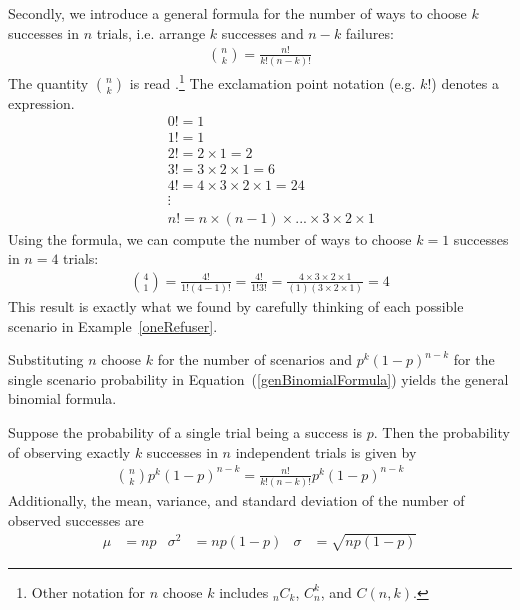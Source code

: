Secondly, we introduce a general formula for the number of ways to choose $k$ successes in $n$ trials, i.e. arrange $k$ successes and $n-k$ failures:
\begin{eqnarray*}
{n\choose k} = \frac{n!}{k!(n-k)!}
\end{eqnarray*}
The quantity ${n\choose k}$ is read .\footnote{Other notation for $n$ choose $k$ includes $_nC_k$, $C_n^k$, and $C(n,k)$.} The exclamation point notation (e.g. $k!$) denotes a \label{factorialDefinitionInTheBinomialSection} expression.
\begin{eqnarray*}
&& 0! = 1 \label{zeroFactorial} \\
&& 1! = 1 \\
&& 2! = 2\times1 = 2 \\
&& 3! = 3\times2\times1 = 6 \\
&& 4! = 4\times3\times2\times1 = 24 \\
&& \vdots \\
&& n! = n\times(n-1)\times...\times3\times2\times1
\end{eqnarray*}
Using the formula, we can compute the number of ways to choose $k=1$ successes in $n=4$ trials:
\begin{eqnarray*}
{4 \choose 1} = \frac{4!}{1!(4-1)!} =  \frac{4!}{1!3!} 
	= \frac{4\times3\times2\times1}{(1)(3\times2\times1)} = 4
\end{eqnarray*}
This result is exactly what we found by carefully thinking of each possible scenario in Example~\ref{oneRefuser}.

Substituting $n$ choose $k$ for the number of scenarios and $p^k(1-p)^{n-k}$ for the single scenario probability in Equation~(\ref{genBinomialFormula}) yields the general binomial formula.

\begin{termBox}{ Suppose the probability of a single trial being a success is $p$. Then the probability of observing exactly $k$ successes in $n$ independent trials is given by\vspace{-1mm}
\begin{eqnarray}
{n\choose k}p^k(1-p)^{n-k} = \frac{n!}{k!(n-k)!}p^k(1-p)^{n-k}
\label{binomialFormula}
\end{eqnarray}
Additionally, the mean, variance, and standard deviation of the number of observed successes are\vspace{-2mm}
\begin{align}
\mu &= np
	&\sigma^2 &= np(1-p)
	&\sigma &= \sqrt{np(1-p)}
\label{binomialStats}
\end{align}}
\end{termBox}

